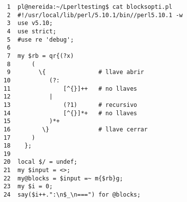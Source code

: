\begin{latexonly}
\begin{verbatim}
  1  pl@nereida:~/Lperltesting$ cat blocksopti.pl
  2  #!/usr/local/lib/perl/5.10.1/bin//perl5.10.1 -w
  3  use v5.10;
  4  use strict;
  5  #use re 'debug';
  6  
  7  my $rb = qr{(?x)
  8      (
  9        \{               # llave abrir
 10           (?:
 11               [^{}]++   # no llaves
 12           |
 13               (?1)      # recursivo
 14               [^{}]*+   # no llaves
 15           )*+
 16         \}              # llave cerrar
 17      )
 18    };
 19  
 20  local $/ = undef;
 21  my $input = <>;
 22  my@blocks = $input =~ m{$rb}g;
 23  my $i = 0;
 24  say($i++.":\n$_\n===") for @blocks;
\end{verbatim}
\end{latexonly}
